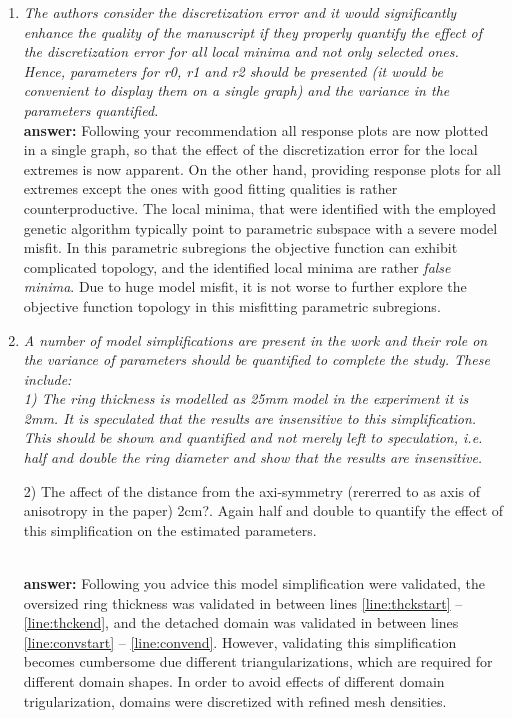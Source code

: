 \documentclass[final,3p, 11pt, a4paper]{elsarticle}
\begin{document}
\begin{enumerate}[label={\bf \Roman*}]
\item {\it  The authors consider the discretization error and it would significantly enhance the quality of the manuscript if they properly quantify the effect of the discretization error for all local minima and not only selected ones. Hence, parameters for r0, r1 and r2 should be presented (it would be convenient to display them on a single graph) and the variance in the parameters quantified.} \\ 
{\bf answer:} Following your recommendation all response plots are now plotted in a single graph, so that the effect of the discretization error for the local extremes is now apparent. On the other hand, providing response plots for all extremes except the ones with good fitting qualities is rather counterproductive. The local minima, that were identified with the employed genetic algorithm typically point to parametric subspace with a severe model misfit. In this parametric subregions the objective function can exhibit complicated topology, and the identified local minima are rather  {\it false minima}. Due to huge model misfit, it is not worse to further explore the objective function topology in this misfitting parametric subregions.

\item {\it  A number of model simplifications are present in the work and their role on the variance of parameters should be quantified to complete the study. These include: \\

 1) The ring thickness is modelled as 25mm model in the experiment it is 2mm. It is speculated that the results are insensitive to this simplification. This should be shown and quantified and not merely left to speculation, i.e. half and double the ring diameter and show that the results are insensitive.


 2) The affect of the distance from the axi-symmetry (rererred to as axis of anisotropy in the paper) 2cm?. Again half and double to quantify the effect of this simplification on the estimated parameters.} \\
 {\bf answer:} Following you advice this model simplification were validated, the oversized ring thickness was validated in between lines \ref{line:thckstart} -- \ref{line:thckend}, and the detached domain was validated in between lines \ref{line:convstart} -- \ref{line:convend}.  However, validating this simplification becomes cumbersome due different triangularizations, which are required for different domain shapes.  In order to avoid effects of different domain trigularization, domains were discretized with  refined mesh densities.



\end{enumerate}
\end{document}
